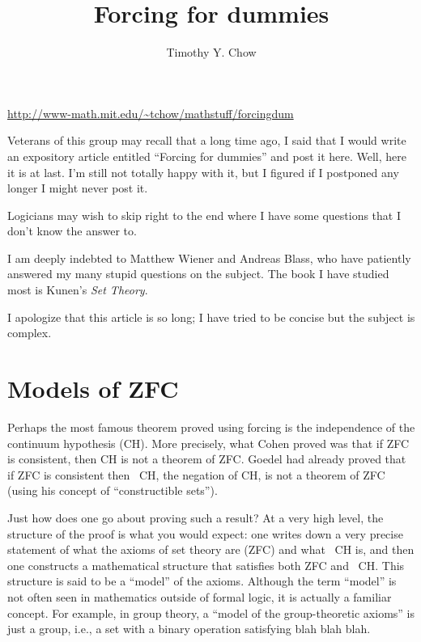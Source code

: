 \documentclass[10pt]{article}
\title{Forcing for dummies}
\author{Timothy Y. Chow}
\date{}
\newcommand\axiom[1]{\textmd{#1}}
\theoremstyle{definition}
\begin{document}
\maketitle

\begin{center}
\url{http://www-math.mit.edu/~tchow/mathstuff/forcingdum}
\end{center}

Veterans of this group may recall that a long time ago, I said that I would write an expository article entitled ``Forcing for dummies'' and post it here. Well, here it is at last. I'm still not totally happy with it, but I figured if I postponed any longer I might never post it. 

Logicians may wish to skip right to the end where I have some questions that I don't know the answer to.

I am deeply indebted to Matthew Wiener and Andreas Blass, who have patiently answered my many stupid questions on the subject. The book I have studied most is Kunen's \textit{Set Theory}. 

I apologize that this article is so long; I have tried to be concise but the subject is complex. 


\section{Models of \axiom{ZFC}}

Perhaps the most famous theorem proved using forcing is the independence of the continuum hypothesis (\axiom{CH}). More precisely, what Cohen proved was that if \axiom{ZFC} is consistent, then \axiom{CH} is not a theorem of \axiom{ZFC}. Goedel had already proved that if \axiom{ZFC} is consistent then \axiom{~CH}, the negation of \axiom{CH}, is not a theorem of \axiom{ZFC} (using his concept of ``constructible sets'').

Just how does one go about proving such a result? At a very high level, the structure of the proof is what you would expect: one writes down a very precise statement of what the axioms of set theory are (\axiom{ZFC}) and what \axiom{~CH} is, and then one constructs a mathematical structure that satisfies both \axiom{ZFC} and \axiom{~CH}. This structure is said to be a ``model'' of the axioms. Although the term ``model'' is not often seen in mathematics outside of formal logic, it is actually a familiar concept. For example, in group theory, a ``model of the group-theoretic axioms'' is just a group, i.e., a set with a binary operation satisfying blah blah blah.
\end{document}
